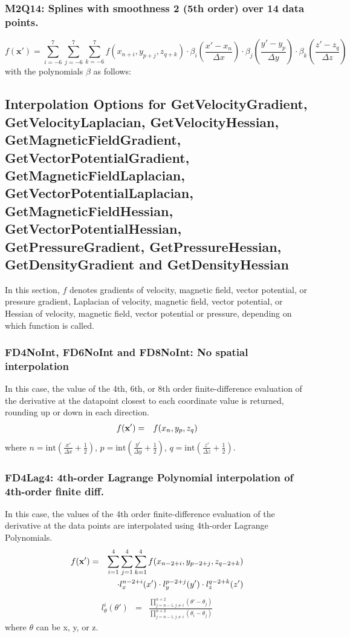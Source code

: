 \documentclass[11pt]{article}
\def\bea{\begin{eqnarray}}
\def\eea{\end{eqnarray}}
\begin{document}
\subsubsection*{M2Q14: Splines with smoothness 2 (5th order) over 14 data points.}
\begin{equation}
    f(\mathbf{x}') =
    \sum_{i=-6}^7 \sum_{j=-6}^7 \sum_{k=-6}^7
    f(x_{n+i}, y_{p+j}, z_{q+k})
    \cdot \beta_i\left(\frac{x' - x_n}{\Delta x}\right)
    \cdot \beta_j\left(\frac{y' - y_p}{\Delta y}\right)
    \cdot \beta_k\left(\frac{z' - z_q}{\Delta z}\right)
\end{equation}
with the polynomials $\beta$ as follows:


\subsection{Interpolation Options for GetVelocityGradient, GetVelocityLaplacian, GetVelocityHessian, GetMagneticFieldGradient, GetVectorPotentialGradient,
 GetMagneticFieldLaplacian, GetVectorPotentialLaplacian, GetMagneticFieldHessian, GetVectorPotentialHessian, GetPressureGradient, GetPressureHessian, GetDensityGradient
 and GetDensityHessian}

In this section, $f$ denotes gradients of velocity, magnetic field, vector potential, or pressure gradient,
Laplacian of velocity, magnetic field, vector potential, or Hessian of velocity, magnetic field, vector potential or pressure, depending on
which function is called.
\subsubsection*{FD4NoInt, FD6NoInt and FD8NoInt: No spatial  interpolation}

In this case, the value of the 4th, 6th, or 8th order finite-difference
evaluation of the derivative at the datapoint closest to each coordinate value is
returned, rounding up or down in each direction.
\bea f({\bf x'}) &=& f(x_n,y_p,z_q)\eea where
$n=\textrm{int}(\frac{x'}{\Delta x}+\frac{1}{2})$,
$p=\textrm{int}(\frac{y'}{\Delta y}+\frac{1}{2})$,
$q=\textrm{int}(\frac{z'}{\Delta z}+\frac{1}{2})$.

\subsubsection*{FD4Lag4: 4th-order Lagrange Polynomial interpolation of 4th-order finite diff.}

In this case, the values of the 4th order finite-difference
evaluation of the derivative at the data points are interpolated using 4th-order Lagrange Polynomials.
\bea f({\bf x'}) &=&
\sum_{i=1}^4\sum_{j=1}^4\sum_{k=1}^4f(x_{n-2+i},y_{p-2+j},z_{q-2+k})\nonumber\\
&&\cdot l_x^{n-2+i}(x')\cdot l_y^{p-2+j}(y')\cdot
l_z^{q-2+k}(z')\eea \bea l_\theta^i(\theta') &=&
\frac{\prod\limits_{j=n-1,j\neq
i}^{n+2}(\theta'-\theta_j)}{\prod\limits_{j=n-1,j\neq
i}^{n+2}(\theta_i-\theta_j)}\eea where $\theta$ can be x, y, or z.
\end{document}
